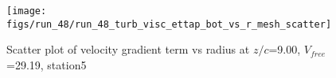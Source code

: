 \begin{figure}[H]
\centering
\texttt{[image: figs/run\_48/run\_48\_turb\_visc\_ettap\_bot\_vs\_r\_mesh\_scatter]}
\caption{Scatter plot of velocity gradient term vs radius at $z/c$=9.00, $V_{free}$=29.19, station5}
\label{fig:run_48_turb_visc_ettap_bot_vs_r_mesh_scatter}
\end{figure}


